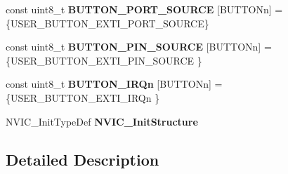 \begin{DoxyCompactItemize}
\item 
\hypertarget{group___s_t_m32_f4___d_i_s_c_o_v_e_r_y___l_o_w___l_e_v_e_l___private___variables_ga043001d613d9070343f086a1fb778b56}{const uint8\-\_\-t {\bfseries B\-U\-T\-T\-O\-N\-\_\-\-P\-O\-R\-T\-\_\-\-S\-O\-U\-R\-C\-E} \mbox{[}B\-U\-T\-T\-O\-Nn\mbox{]} = \{U\-S\-E\-R\-\_\-\-B\-U\-T\-T\-O\-N\-\_\-\-E\-X\-T\-I\-\_\-\-P\-O\-R\-T\-\_\-\-S\-O\-U\-R\-C\-E\}}\label{group___s_t_m32_f4___d_i_s_c_o_v_e_r_y___l_o_w___l_e_v_e_l___private___variables_ga043001d613d9070343f086a1fb778b56}

\item 
\hypertarget{group___s_t_m32_f4___d_i_s_c_o_v_e_r_y___l_o_w___l_e_v_e_l___private___variables_ga80c29ecf61c61be41ec382cd2a93fcec}{const uint8\-\_\-t {\bfseries B\-U\-T\-T\-O\-N\-\_\-\-P\-I\-N\-\_\-\-S\-O\-U\-R\-C\-E} \mbox{[}B\-U\-T\-T\-O\-Nn\mbox{]} = \{U\-S\-E\-R\-\_\-\-B\-U\-T\-T\-O\-N\-\_\-\-E\-X\-T\-I\-\_\-\-P\-I\-N\-\_\-\-S\-O\-U\-R\-C\-E \}}\label{group___s_t_m32_f4___d_i_s_c_o_v_e_r_y___l_o_w___l_e_v_e_l___private___variables_ga80c29ecf61c61be41ec382cd2a93fcec}

\item 
\hypertarget{group___s_t_m32_f4___d_i_s_c_o_v_e_r_y___l_o_w___l_e_v_e_l___private___variables_ga13c3e27c584df9fccc4697dd535ea1cd}{const uint8\-\_\-t {\bfseries B\-U\-T\-T\-O\-N\-\_\-\-I\-R\-Qn} \mbox{[}B\-U\-T\-T\-O\-Nn\mbox{]} = \{U\-S\-E\-R\-\_\-\-B\-U\-T\-T\-O\-N\-\_\-\-E\-X\-T\-I\-\_\-\-I\-R\-Qn \}}\label{group___s_t_m32_f4___d_i_s_c_o_v_e_r_y___l_o_w___l_e_v_e_l___private___variables_ga13c3e27c584df9fccc4697dd535ea1cd}

\item 
\hypertarget{group___s_t_m32_f4___d_i_s_c_o_v_e_r_y___l_o_w___l_e_v_e_l___private___variables_ga97a738439b47cc7e96fb8c57ea0f94df}{N\-V\-I\-C\-\_\-\-Init\-Type\-Def {\bfseries N\-V\-I\-C\-\_\-\-Init\-Structure}}\label{group___s_t_m32_f4___d_i_s_c_o_v_e_r_y___l_o_w___l_e_v_e_l___private___variables_ga97a738439b47cc7e96fb8c57ea0f94df}

\end{DoxyCompactItemize}


\subsection{Detailed Description}


